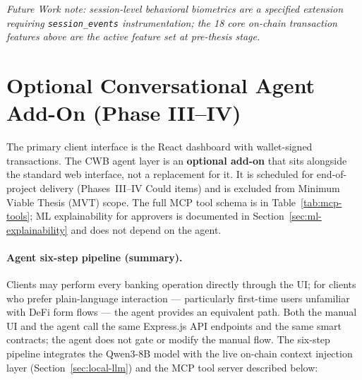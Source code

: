 \documentclass[12pt,a4paper]{report}
\begin{document}
\noindent\textit{Future Work note: session-level behavioral biometrics are a specified extension requiring \texttt{session\_events} instrumentation; the 18 core on-chain transaction features above are the active feature set at pre-thesis stage.}

\section{Optional Conversational Agent Add-On (Phase III--IV)}
\label{sec:optional-agent}

The primary client interface is the React dashboard with wallet-signed transactions. The CWB agent layer is an \textbf{optional add-on} that sits alongside the standard web interface, not a replacement for it. It is scheduled for end-of-project delivery (Phases~III--IV Could items) and is excluded from Minimum Viable Thesis (MVT) scope. The full MCP tool schema is in Table~\ref{tab:mcp-tools}; ML explainability for approvers is documented in Section~\ref{sec:ml-explainability} and does not depend on the agent.

\paragraph{Agent six-step pipeline (summary).} Clients may perform every banking operation directly through the UI; for clients who prefer plain-language interaction --- particularly first-time users unfamiliar with DeFi form flows --- the agent provides an equivalent path. Both the manual UI and the agent call the same Express.js API endpoints and the same smart contracts; the agent does not gate or modify the manual flow. The six-step pipeline integrates the Qwen3-8B model with the live on-chain context injection layer (Section~\ref{sec:local-llm}) and the MCP tool server described below:
\end{document}
